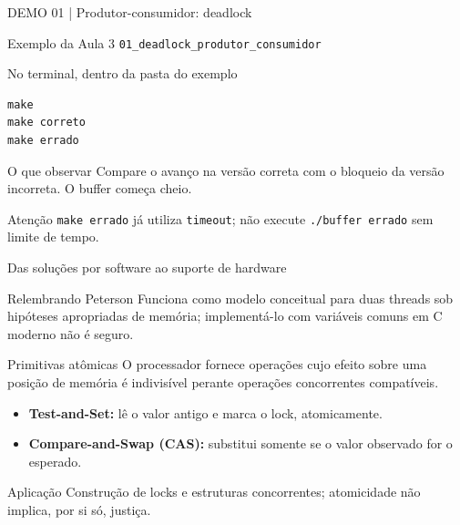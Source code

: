 \documentclass[aspectratio=169,11pt]{beamer}
\begin{document}
\begin{frame}[fragile]{DEMO 01 | Produtor-consumidor: deadlock}
\small
\begin{block}{Exemplo da Aula 3}
\texttt{01\_deadlock\_produtor\_consumidor}
\end{block}
\begin{block}{No terminal, dentro da pasta do exemplo}
\begin{verbatim}
make
make correto
make errado
\end{verbatim}
\end{block}
\begin{exampleblock}{O que observar}
Compare o avanço na versão correta com o bloqueio da versão incorreta. O buffer começa cheio.
\end{exampleblock}
\begin{alertblock}{Atenção}
\texttt{make errado} já utiliza \texttt{timeout}; não execute \texttt{./buffer errado} sem limite de tempo.
\end{alertblock}
\end{frame}

\begin{frame}{Das soluções por software ao suporte de hardware}
\small
\begin{block}{Relembrando Peterson}
Funciona como modelo conceitual para duas threads sob hipóteses apropriadas de memória; implementá-lo com variáveis comuns em C moderno não é seguro.
\end{block}
\begin{block}{Primitivas atômicas}
O processador fornece operações cujo efeito sobre uma posição de memória é indivisível perante operações concorrentes compatíveis.
\end{block}
\begin{itemize}
\item \textbf{Test-and-Set:} lê o valor antigo e marca o lock, atomicamente.
\item \textbf{Compare-and-Swap (CAS):} substitui somente se o valor observado for o esperado.
\end{itemize}
\begin{alertblock}{Aplicação}
Construção de locks e estruturas concorrentes; atomicidade não implica, por si só, justiça.
\end{alertblock}
\end{frame}
\end{document}
